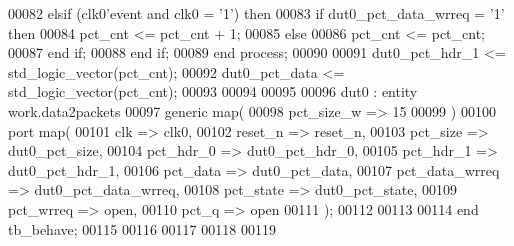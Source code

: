 \begin{DoxyCode}
00082       \textcolor{keywordflow}{elsif} \textcolor{vhdlchar}{(}\textcolor{vhdlchar}{clk0}\textcolor{vhdlchar}{'}\textcolor{vhdlkeyword}{event} \textcolor{keywordflow}{and} \textcolor{vhdlchar}{clk0} \textcolor{vhdlchar}{=} \textcolor{vhdlchar}{'}\textcolor{vhdllogic}{}\textcolor{vhdllogic}{1}\textcolor{vhdlchar}{'}\textcolor{vhdlchar}{)} \textcolor{keywordflow}{then}
00083          \textcolor{keywordflow}{if} \textcolor{vhdlchar}{dut0_pct_data_wrreq} \textcolor{vhdlchar}{=} \textcolor{vhdlchar}{'}\textcolor{vhdllogic}{}\textcolor{vhdllogic}{1}\textcolor{vhdlchar}{'} \textcolor{keywordflow}{then} 
00084             \textcolor{vhdlchar}{pct_cnt} \textcolor{vhdlchar}{<=} \textcolor{vhdlchar}{pct_cnt} \textcolor{vhdlchar}{+} \textcolor{vhdllogic}{}\textcolor{vhdllogic}{1};
00085          \textcolor{keywordflow}{else} 
00086             \textcolor{vhdlchar}{pct_cnt} \textcolor{vhdlchar}{<=} \textcolor{vhdlchar}{pct_cnt};
00087          \textcolor{keywordflow}{end} \textcolor{keywordflow}{if};
00088         \textcolor{keywordflow}{end} \textcolor{keywordflow}{if};
00089     \textcolor{keywordflow}{end} \textcolor{keywordflow}{process};
00090     
00091     \textcolor{vhdlchar}{dut0_pct_hdr_1} \textcolor{vhdlchar}{<=} \textcolor{comment}{std\_logic\_vector}\textcolor{vhdlchar}{(}\textcolor{vhdlchar}{pct_cnt}\textcolor{vhdlchar}{)};
00092     \textcolor{vhdlchar}{dut0_pct_data}  \textcolor{vhdlchar}{<=} \textcolor{comment}{std\_logic\_vector}\textcolor{vhdlchar}{(}\textcolor{vhdlchar}{pct_cnt}\textcolor{vhdlchar}{)};
00093    
00094 
00095   
00096   dut0 : \textcolor{keywordflow}{entity} work.data2packets
00097    \textcolor{keywordflow}{generic} \textcolor{keywordflow}{map}(
00098       pct_size_w        => \textcolor{vhdllogic}{15}
00099    \textcolor{vhdlchar}{)}
00100    \textcolor{keywordflow}{port} \textcolor{keywordflow}{map}(              
00101       clk               => clk0,
00102       reset_n           => reset_n,
00103       pct_size          => dut0_pct_size,
00104       pct_hdr_0         => dut0_pct_hdr_0,
00105       pct_hdr_1         => dut0_pct_hdr_1,
00106       pct_data          => dut0_pct_data,
00107       pct_data_wrreq    => dut0_pct_data_wrreq,
00108       pct_state         => dut0_pct_state,
00109       pct_wrreq         => \textcolor{keywordflow}{open},
00110       pct_q             => \textcolor{keywordflow}{open}
00111       \textcolor{vhdlchar}{)};
00112       
00113     
00114     \textcolor{keywordflow}{end} \textcolor{vhdlchar}{tb\_behave};
00115   
00116   
00117 
00118 
00119   
\end{DoxyCode}
